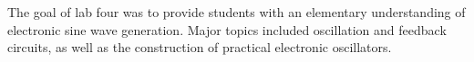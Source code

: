 The goal of lab four was to provide students with an elementary understanding
of electronic sine wave generation.  Major topics included oscillation and
feedback circuits, as well as the construction of practical electronic
oscillators.
